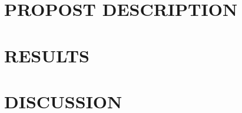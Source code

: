 \documentclass{article}
\begin{document}
    
    \section{PROPOST DESCRIPTION}
    \label{sec:pro}
    
    
    
    
    
    
    
    
    
    
    
    
    
    
    
    
    
    
    
    
    
    \section{RESULTS}
    \label{sec:pagestyle}
    
    
    \section{DISCUSSION}
    \label{sec:typestyle}
    
    
    
    
    
    
\end{document}
